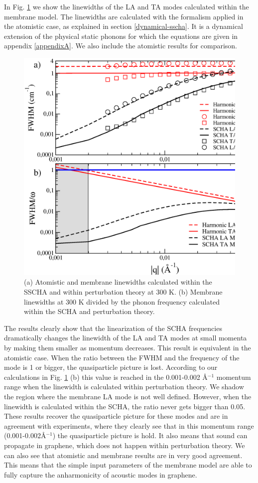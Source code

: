 In Fig. \ref{lw-membrane} we show the linewidths of the LA and TA modes calculated within the membrane model. The 
linewidths are calculated with the formalism applied in the atomistic case, as explained in 
section \ref{dynamical-sscha}. It is a dynamical extension of the physical static phonons for which the 
equations are given in appendix \ref{appendixA}. We also include the atomistic results for comparison.
\begin{figure}[ht]
\includegraphics[width=0.8\linewidth]{Figures/lwmembrane.eps}
	\caption[Atomistic and membrane linewidths calculated within the SSCHA and within perturbation theory in 
	graphene]{(a) Atomistic and membrane linewidths calculated within the SSCHA and within perturbation theory 
	at 300 K. (b) Membrane linewidths at 300 K divided by the phonon frequency calculated within the SCHA and 
	perturbation theory.}
\label{lw-membrane}
\end{figure}
The results clearly show that the linearization of the SCHA frequencies dramatically changes the linewidth of the LA 
and TA modes at small momenta by making them smaller as momentum decreases. This result is equivalent in the 
atomistic case. When the ratio between the FWHM and the frequency of the mode is 1 or bigger, the quasiparticle 
picture is lost. According to our calculations in Fig. \ref{lw-membrane} (b) this value is reached in the 0.001-0.002 
\AA$^{-1}$ momentum range when the linewidth is calculated within perturbation theory. We shadow the region where the 
membrane LA mode is not well defined. However, when the linewidth is 
calculated within the SCHA, the ratio never gets bigger than 0.05. These results recover the quasiparticle picture 
for these modes and are in agreement with experiments\cite{wang2008brillouin}, where they clearly see that in this 
momentum range (0.001-0.002\AA$^{-1}$) the quasiparticle picture is hold. It also means that sound can propagate in 
graphene, which does not happen within perturbation theory. We can also see that atomistic and membrane results are 
in very good agreement. This means that the simple input parameters of the membrane model are able to fully capture 
the anharmonicity of acoustic modes in graphene. \\

